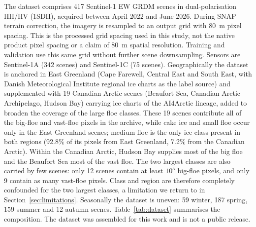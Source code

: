\documentclass[preprint,12pt,authoryear]{elsarticle}
\begin{document}
The dataset comprises 417 Sentinel-1 EW GRDM scenes in dual-polarisation HH/HV
(1SDH), acquired between April 2022 and June 2026. During SNAP terrain
correction, the imagery is resampled to an output grid with 80~m pixel
spacing. This is the processed grid spacing used in this study, not the
native product pixel spacing or a claim of 80~m spatial resolution.
Training and validation use this same grid without further scene
downsampling. Sensors are Sentinel-1A (342 scenes) and Sentinel-1C (75 scenes).
Geographically the dataset is anchored in East Greenland (Cape Farewell,
Central East and South East, with Danish Meteorological Institute regional ice
charts as the label source) and supplemented with 19 Canadian Arctic scenes
(Beaufort Sea, Canadian Arctic Archipelago, Hudson Bay) carrying ice charts of
the AI4Arctic lineage, added to broaden the coverage of the large floe classes.
These 19 scenes contribute all of the big-floe and vast-floe pixels in the
archive, while cake ice and small floe occur only in the East Greenland scenes;
medium floe is the only ice class present in both regions (92.8\% of its
pixels from East Greenland, 7.2\% from the Canadian Arctic). Within the
Canadian Arctic, Hudson Bay supplies most of the big floe and the Beaufort Sea
most of the vast floe. The two largest classes are also carried by few scenes:
only 12 scenes contain at least $10^5$ big-floe pixels, and only 9 contain as
many vast-floe pixels. Class and region are therefore completely confounded for
the two largest classes, a limitation we return to in
Section~\ref{sec:limitations}.
Seasonally the dataset is uneven: 59 winter, 187 spring, 159 summer and
12 autumn scenes. Table~\ref{tab:dataset} summarises the composition. The
dataset was assembled for this work and is not a public release.
\end{document}
